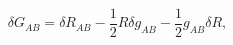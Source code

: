 \begin{equation}
\delta G_{\si{AB}} = \delta R_{\si{AB}} - \frac{1}{2} R \delta g_{\si{AB}} -
\frac{1}{2} g_{\si{AB}} \delta R,
\end{equation}

